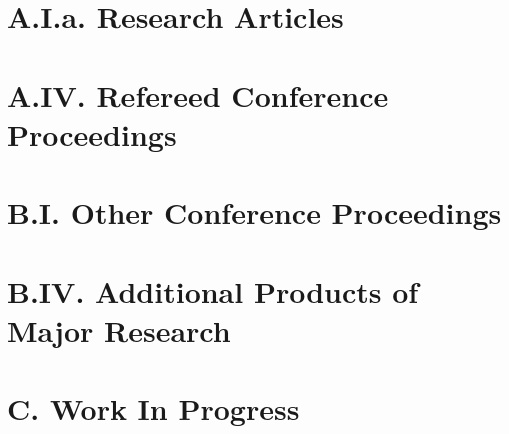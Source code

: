 \documentclass[11pt]{res}
\newcommand{\MarginText}[1]{\section{#1}\vspace{10pt}}
\begin{document}


\address{}
\address{}

\newcommand{\DOI}[1]{\href{https://doi.org/#1}{doi:#1}}
\begin{resume}

\MarginText{A.I.a. Research Articles}
\nocite{*}
\vspace{10pt}
\printbibliography[heading=none]
\clearpage

\MarginText{A.IV. Refereed Conference Proceedings}
\nocite{*}
\vspace{10pt}
\printbibliography[heading=none]
\clearpage


\MarginText{B.I. Other Conference Proceedings}
\nocite{*}
\vspace{10pt}
\printbibliography[heading=none]
\clearpage

\MarginText{B.IV. Additional Products of Major Research}
\nocite{*}
\vspace{10pt}
\printbibliography[heading=none]
\clearpage

\MarginText{C. Work In Progress}
\nocite{*}
\vspace{10pt}
\printbibliography[heading=none]
\clearpage

\end{resume}
\end{document}
